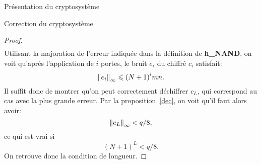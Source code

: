 \begin{section}{Présentation du cryptosystème}
\begin{subsection}{Correction du cryptosystème}
\begin{proof}
\begin{align*}
	\end{align*}
	Utilisant la majoration de l'erreur indiquée dans la définition de
	\textbf{h\_NAND}, on voit qu'après l'application de $i$ portes, le bruit $e_i$ du
	chiffré  $c_i$ satisfait:
	\[ {\|e_i\|}_{\infty} \leqslant {(N+1)}^i  mn. \]
	Il suffit donc de montrer qu'on peut correctement déchiffrer
	$c_L$, qui correspond au cas avec la plus grande erreur. Par la proposition~\ref{dec}, on voit qu'il faut alors avoir:
	\[ {\|e_L\|}_{\infty} < q/8, \]
	ce qui est vrai si
	\[ {(N+1)}^L < q/8. \]
	On retrouve donc la condition de longueur.
	\end{proof}
	\end{subsection}
\end{section}
